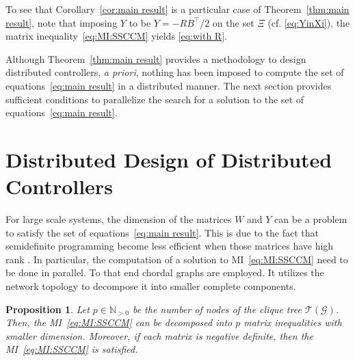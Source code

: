 \documentclass[10pt,twocolumn,twoside]{IEEEtran}
\newcounter{para}
\newcommand\mypara{\par}
\theoremstyle{plain}
\newtheorem{proposition}{Proposition}
\theoremstyle{definition}
\theoremstyle{remark}
\begin{document}
\mypara To see that Corollary~\ref{cor:main result} is a particular case of Theorem~\ref{thm:main result}, note that imposing $Y$ to be $Y=-RB^\top/2$ on the set $\Xi$ (cf. \eqref{eq:YinXi}), the matrix inequality~\eqref{eq:MI:SSCCM} yields \eqref{eq:with R}. 

\mypara Although Theorem~\ref{thm:main result} provides a methodology to design distributed controllers, \emph{a priori}, nothing has been imposed to compute the set of equations~\eqref{eq:main result} in a distributed manner. The next section provides sufficient conditions to parallelize the search for a solution to the set of equations~\eqref{eq:main result}.

\section{Distributed Design of Distributed Controllers}\label{sec:distributed_design}

\mypara For large scale systems, the dimension of the matrices $W$ and $Y$ can be a problem to satisfy the set of equations~\eqref{eq:main result}. This is due to the fact that semidefinite programming become less efficient when those matrices have high rank \cite{VandenbergheBoyd1996}. In particular, the computation of a solution to MI~\eqref{eq:MI:SSCCM} need to be done in parallel. To that end chordal graphs are employed. It utilizes the network topology to decompose it into smaller complete components. 

\begin{proposition}\label{prop:clique tree decomposition}
	Let $p\in\mathbb{N}_{>0}$ be the number of nodes of the clique tree $\mathscr{T}(\mathscr{G})$. Then, the MI~\eqref{eq:MI:SSCCM} can be decomposed into $p$ matrix inequalities with smaller dimension. Moreover, if each matrix is negative definite, then the MI~\eqref{eq:MI:SSCCM} is satisfied.
\end{proposition}
\end{document}
